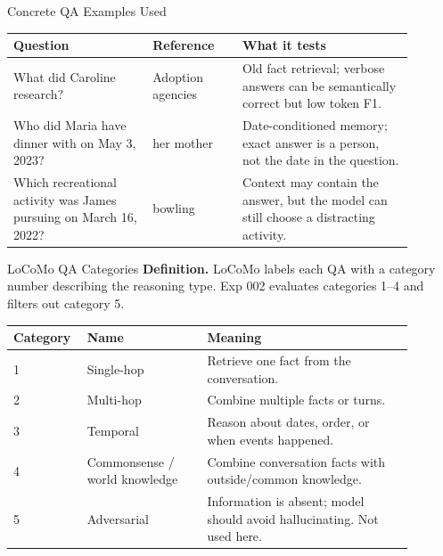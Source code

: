 \documentclass[aspectratio=169]{beamer}
\newcommand{\metric}[1]{\textbf{#1}}
\begin{document}
\begin{frame}{Concrete QA Examples Used}
\begin{tabular}{p{0.31\linewidth}p{0.20\linewidth}p{0.38\linewidth}}
\toprule
Question & Reference & What it tests \\
\midrule
What did Caroline research? & Adoption agencies & Old fact retrieval; verbose answers can be semantically correct but low token F1. \\
Who did Maria have dinner with on May 3, 2023? & her mother & Date-conditioned memory; exact answer is a person, not the date in the question. \\
Which recreational activity was James pursuing on March 16, 2022? & bowling & Context may contain the answer, but the model can still choose a distracting activity. \\
\bottomrule
\end{tabular}
\end{frame}

\begin{frame}{LoCoMo QA Categories}
\metric{Definition.} LoCoMo labels each QA with a category number describing the reasoning type. Exp 002 evaluates categories 1--4 and filters out category 5.

\vspace{0.5em}
\begin{tabular}{p{0.13\linewidth}p{0.28\linewidth}p{0.48\linewidth}}
\toprule
Category & Name & Meaning \\
\midrule
1 & Single-hop & Retrieve one fact from the conversation. \\
2 & Multi-hop & Combine multiple facts or turns. \\
3 & Temporal & Reason about dates, order, or when events happened. \\
4 & Commonsense / world knowledge & Combine conversation facts with outside/common knowledge. \\
5 & Adversarial & Information is absent; model should avoid hallucinating. Not used here. \\
\bottomrule
\end{tabular}
\end{frame}
\end{document}

